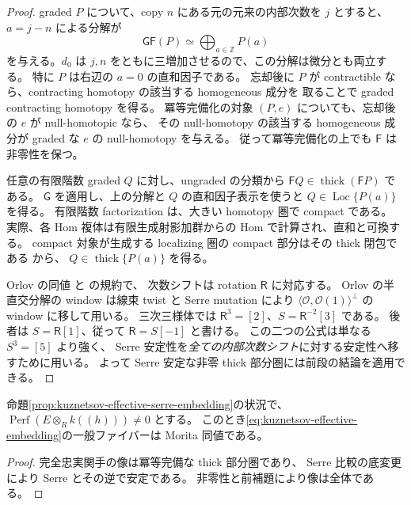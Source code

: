 \begin{proof}
graded $P$ について、copy $n$ にある元の元来の内部次数を $j$ とすると、
$a=j-n$ による分解が
\[
 \mathsf G\mathsf F(P)\simeq\bigoplus_{a\in\mathbb Z}P(a)
\]
を与える。$d_0$ は $j,n$ をともに三増加させるので、この分解は微分とも両立する。
特に $P$ は右辺の $a=0$ の直和因子である。
忘却後に $P$ が contractible なら、contracting homotopy の該当する homogeneous 成分を
取ることで graded contracting homotopy を得る。
冪等完備化の対象 $(P,e)$ についても、忘却後の $e$ が null-homotopic なら、
その null-homotopy の該当する homogeneous 成分が graded な $e$ の null-homotopy を与える。
従って冪等完備化の上でも $\mathsf F$ は非零性を保つ。

任意の有限階数 graded $Q$ に対し、ungraded の分類から
$\mathsf FQ\in\operatorname{thick}(\mathsf FP)$ である。
$\mathsf G$ を適用し、上の分解と $Q$ の直和因子表示を使うと
$Q\in\operatorname{Loc}\{P(a)\}$ を得る。
有限階数 factorization は、大きい homotopy 圏で compact である。
実際、各 Hom 複体は有限生成射影加群からの Hom で計算され、直和と可換する。
compact 対象が生成する localizing 圏の compact 部分はその thick 閉包である
\cite[Lemma~2.2]{NeemanCompactLocalization}から、
$Q\in\operatorname{thick}\{P(a)\}$ を得る。

Orlov の同値 \cite[Theorems~2.5 and~3.10--3.11]{OrlovSingularities} と
\cite[\S3.3, Corollary~3.18, Lemma~3.19 and Corollary~4.1]{KuznetsovFractionalCY} の規約で、
次数シフトは rotation $\mathsf R$ に対応する。
Orlov の半直交分解の window は線束 twist と Serre mutation により
$\langle\mathcal O,\mathcal O(1)\rangle^\perp$ の window に移して用いる。
三次三様体では
$\mathsf R^3=[2]$、$S=\mathsf R^{-2}[3]$ である。
後者は $S=\mathsf R[1]$、従って $\mathsf R=S[-1]$ と書ける。
この二つの公式は単なる $S^3=[5]$ より強く、
Serre 安定性を\emph{全ての内部次数シフト}に対する安定性へ移すために用いる。
よって Serre 安定な非零 thick 部分圏には前段の結論を適用できる。
\end{proof}

\begin{corollary}[非零一般ファイバーの幾何性]
\label{cor:kuznetsov-formal-to-generic}
命題\ref{prop:kuznetsov-effective-serre-embedding}の状況で、
$\operatorname{Perf}(E\otimes_R k((h)))\ne0$ とする。
このとき\eqref{eq:kuznetsov-effective-embedding}の一般ファイバーは Morita 同値である。
\end{corollary}
\begin{proof}
完全忠実関手の像は冪等完備な thick 部分圏であり、
Serre 比較の底変更により Serre とその逆で安定である。
非零性と前補題により像は全体である。
\end{proof}

